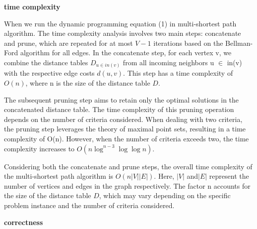 
\textbf{time complexity}

When we run the dynamic programming equation (1) in multi-shortest path algorithm. The time complexity analysis involves two main steps: concatenate and prune, which are repeated for at most $V-1$ iterations based on the Bellman-Ford algorithm for all edges. In the concatenate step, for each vertex v, we combine the distance tables $D_{u \in in(v)}$ from all incoming neighbors u $\in$ in(v) with the respective edge costs $d(u, v)$. This step has a time complexity of $O(n)$, where n is the size of the distance table $D$.

The subsequent pruning step aims to retain only the optimal solutions in the concatenated distance table. The time complexity of this pruning operation depends on the number of criteria considered. When dealing with two criteria, the pruning step leverages the theory of maximal point sets, resulting in a time complexity of O(n). However, when the number of criteria exceeds two, the time complexity increases to $O(n\log^{n-3}\log\log n)$.

Considering both the concatenate and prune steps, the overall time complexity of the multi-shortest path algorithm is $O(n|V||E|)$. Here, $|V|$ and$ |E|$ represent the number of vertices and edges in the graph respectively. The factor n accounts for the size of the distance table $D$, which may vary depending on the specific problem instance and the number of criteria considered.

 \textbf{correctness}

   

